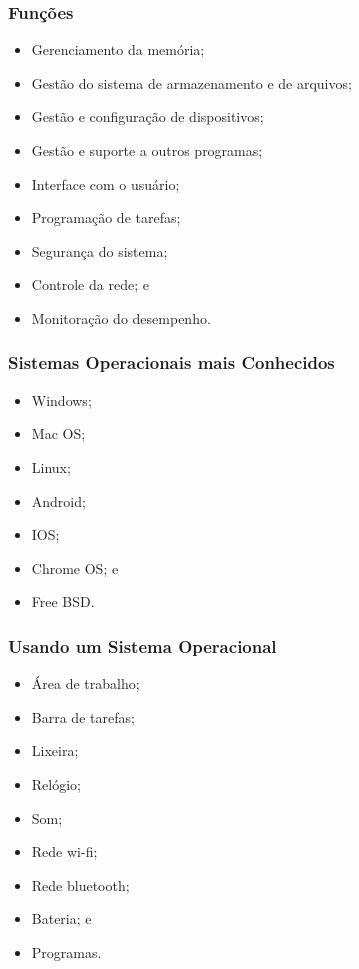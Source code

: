 \documentclass[aspectratio=169]{beamer} %
\begin{document}
\begin{frame}
	\frametitle{Funções}
		
	\begin{itemize}
		\item Gerenciamento da memória;
		\item Gestão do sistema de armazenamento e de arquivos; 
		\item Gestão e configuração de dispositivos;
		\item Gestão e suporte a outros programas; 
		\item Interface com o usuário;
		\item Programação de tarefas;
		\item Segurança do sistema;
		\item Controle da rede; e
		\item Monitoração do desempenho.
	\end{itemize}
\end{frame}

\begin{frame}
	\frametitle{Sistemas Operacionais mais Conhecidos}
		
	\begin{itemize}
		\item Windows;
		\item Mac OS;
		\item Linux;
		\item Android;
		\item IOS;
		\item Chrome OS; e
		\item Free BSD.
	\end{itemize}
\end{frame}

\begin{frame}
	\frametitle{Usando um Sistema Operacional}
		
	\begin{itemize}
		\item Área de trabalho;
		\item Barra de tarefas;
		\item Lixeira;
		\item Relógio;
		\item Som;
		\item Rede wi-fi;
		\item Rede bluetooth;
		\item Bateria; e
		\item Programas.
	\end{itemize}
\end{frame}
\end{document}
